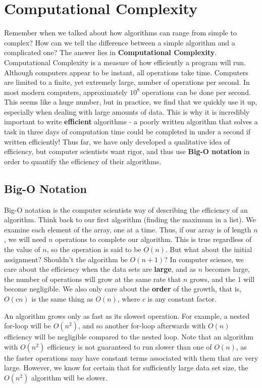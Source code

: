 \section{Computational Complexity}

Remember when we talked about how algorithms can range from simple to complex? How can we tell the difference between a simple algorithm and a complicated one? The answer lies in \textbf{Computational Complexity}.  Computational Complexity is a measure of how efficiently a program will run.  Although computers appear to be instant, all operations take time.  Computers are limited to a finite, yet extremely large, number of operations per second. In most modern computers, approximately $ 10^8 $ operations can be done per second.  This seems like a huge number, but in practice, we find that we quickly use it up, especially when dealing with large amounts of data.  This is why it is incredibly important to write \textbf{efficient} algorithms - a poorly written algorithm that solves a task in three days of computation time could be completed in under a second if written efficiently! Thus far, we have only developed a qualitative idea of efficiency, but computer scientists want rigor, and thus use \textbf{Big-O notation} in order to quantify the efficiency of their algorithms.

\subsection{Big-O Notation}

Big-O notation is the computer scientists way of describing the efficiency of an algorithm.  Think back to our first algorithm (finding the maximum in a list).  We examine each element of the array, one at a time.  Thus, if our array is of length $ n $, we will need $ n $ operations to complete our algorithm.  This is true regardless of the value of $ n $, so the operation is said to be $ O(n) $.  But what about the initial assignment? Shouldn't the algorithm be $ O(n + 1) $?  In computer science, we care about the efficiency when the data sets are \textbf{large}, and as $ n $ becomes large, the number of operations will grow at the same rate that $ n $ grows, and the $ 1 $ will become negligible.  We also only care about the \textbf{order} of the growth, that is, $ O(cn) $ is the same thing as $ O(n) $, where $ c $ is any constant factor.

An algorithm grows only as fast as its slowest operation.  For example, a nested for-loop will be $ O(n^2) $, and so another for-loop afterwards with $ O(n) $ efficiency will be negligible compared to the nested loop.  Note that an algorithm with $ O(n^2) $ efficiency is not guaranteed to run slower than one of $ O(n) $, as the faster operations may have constant terms associated with them that are very large.  However, we know for certain that for sufficiently large data set size, the $ O(n^2) $ algorithm will be slower.

